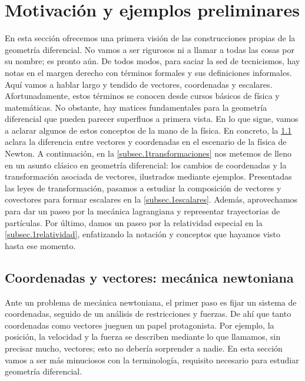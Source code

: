\newpage
\section{Motivación y ejemplos preliminares}
\label{sec.1motivacion}

En esta sección ofrecemos una primera visión de las construcciones propias de la geometría diferencial. No vamos a ser rigurosos ni a llamar a todas las cosas por su nombre; es pronto aún. De todos modos, para saciar la sed de tecnicismos, hay notas en el margen derecho con términos formales y sus definiciones informales. Aquí vamos a hablar largo y tendido de vectores, coordenadas y escalares. Afortunadamente, estos términos se conocen desde cursos básicos de física y matemáticas. No obstante, hay matices fundamentales para la geometría diferencial que pueden parecer superfluos a primera vista. En lo que sigue, vamos a aclarar algunos de estos conceptos de la mano de la física. En concreto, la \cref{subsec.1newton} aclara la diferencia entre vectores y coordenadas en el escenario de la física de Newton. A continuación, en la \cref{subsec.1transformaciones} nos metemos de lleno en un asunto clásico en geometría diferencial: los cambios de coordenadas y la transformación asociada de vectores, ilustrados mediante ejemplos. Presentadas las leyes de transformación, pasamos a estudiar la composición de vectores y covectores para formar escalares en la \cref{subsec.1escalares}. Además, aprovechamos para dar un paseo por la mecánica lagrangiana y representar trayectorias de partículas. Por último, damos un paseo por la relatividad especial en la \cref{subsec.1relatividad}, enfatizando la notación y conceptos que hayamos visto hasta ese momento.

\subsection{Coordenadas y vectores: mecánica newtoniana}
\label{subsec.1newton}

Ante un problema de mecánica newtoniana, el primer paso es fijar un sistema de coordenadas, seguido de un análisis de restricciones y fuerzas. De ahí que tanto coordenadas como vectores jueguen un papel protagonista. Por ejemplo, la posición, la velocidad y la fuerza se describen mediante lo que llamamos, sin precisar mucho, vectores; esto no debería sorprender a nadie. En esta sección vamos a ser más minuciosos con la terminología, requisito necesario para estudiar geometría diferencial.

